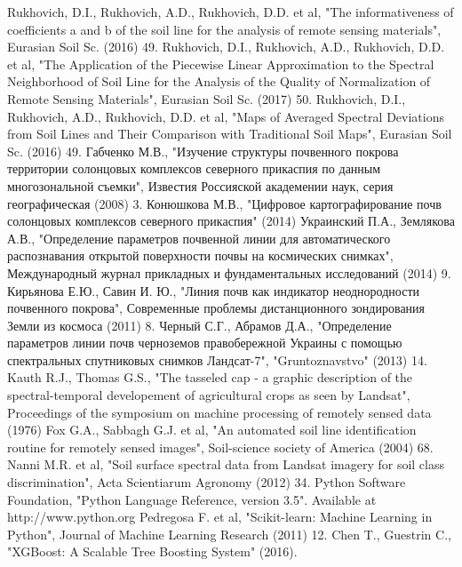 \documentclass[14pt]{extarticle}
\begin{document}
\begin{thebibliography}{9}
        Rukhovich, D.I., Rukhovich, A.D., Rukhovich, D.D. et al, 
        "The informativeness of coefficients a and b of the 
        soil line for the analysis of remote sensing materials",
        Eurasian Soil Sc. (2016) 49.
        Rukhovich, D.I., Rukhovich, A.D., Rukhovich, D.D. et al, 
        "The Application of the Piecewise Linear Approximation
        to the Spectral Neighborhood of Soil Line for the Analysis
        of the Quality of Normalization of Remote Sensing Materials",
        Eurasian Soil Sc. (2017) 50.
        Rukhovich, D.I., Rukhovich, A.D., Rukhovich, D.D. et al, 
        "Maps of Averaged Spectral Deviations from Soil Lines
        and Their Comparison with Traditional Soil Maps",
        Eurasian Soil Sc. (2016) 49.
        Габченко М.В., "Изучение структуры почвенного покрова территории солонцовых
        комплексов северного прикаспия по данным многозональной съемки", 
        Известия Россияской академении наук, серия географическая (2008) 3.
        Конюшкова М.В., "Цифровое картографирование почв солонцовых комплексов
        северного прикаспия" (2014)
        Украинский П.А., Землякова А.В., "Определение параметров почвенной линии
        для автоматического распознавания открытой поверхности почвы на космических
        снимках", Международный журнал прикладных и фундаментальных исследований
        (2014) 9.
        Кирьянова Е.Ю., Савин И. Ю., "Линия почв как индикатор неоднородности
        почвенного покрова", Современные проблемы дистанционного зондирования
        Земли из космоса (2011) 8.
        Черный С.Г., Абрамов Д.А., "Определение параметров линии почв черноземов
        правобережной Украины с помощью спектральных спутниковых снимков Ландсат-7",
        "Gruntoznavstvo" (2013) 14.
        Kauth R.J., Thomas G.S., "The tasseled cap - a graphic description of the
        spectral-temporal developement of agricultural crops as seen by Landsat",
        Proceedings of the symposium on machine processing of remotely sensed data (1976)
        Fox G.A., Sabbagh G.J. et al, "An automated soil line identification routine
        for remotely sensed images", Soil-science society of America (2004) 68.
        Nanni M.R. et al, "Soil surface spectral data from Landsat imagery for soil class
        discrimination", Acta Scientiarum Agronomy (2012) 34.
        Python Software Foundation, "Python Language Reference, 
        version 3.5". Available at http://www.python.org
        Pedregosa F. et al, "Scikit-learn: Machine Learning in Python",
        Journal of Machine Learning Research (2011) 12.
        Chen T., Guestrin C., "XGBoost: A Scalable Tree Boosting System" (2016).
\end{thebibliography}
\end{document}
